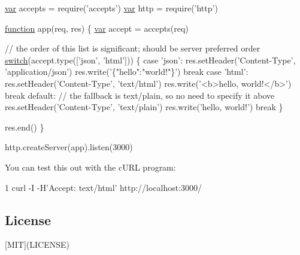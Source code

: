 \begin{DoxyCode}
\hyperlink{018__def_8c_a335628f2e9085305224b4f9cc6e95ed5}{var} accepts = require(\textcolor{stringliteral}{'accepts'})
\hyperlink{018__def_8c_a335628f2e9085305224b4f9cc6e95ed5}{var} http = require('http')

\hyperlink{class_test_a51a683fa4fcec142ab1574e00a7b6860}{function} app(req, res) \{
  \hyperlink{018__def_8c_a335628f2e9085305224b4f9cc6e95ed5}{var} accept = accepts(req)

  \textcolor{comment}{// the order of this list is significant; should be server preferred order}
  \hyperlink{ce__parse_8cpp_ada8aa24d50028bab4e2a4437e6eb7807}{switch}(accept.type(['json', 'html'])) \{
    \textcolor{keywordflow}{case} \textcolor{stringliteral}{'json'}:
      res.setHeader(\textcolor{stringliteral}{'Content-Type'}, \textcolor{stringliteral}{'application/json'})
      res.write(\textcolor{stringliteral}{'\{"hello":"world!"\}'})
      \textcolor{keywordflow}{break}
    \textcolor{keywordflow}{case} \textcolor{stringliteral}{'html'}:
      res.setHeader(\textcolor{stringliteral}{'Content-Type'}, \textcolor{stringliteral}{'text/html'})
      res.write(\textcolor{stringliteral}{'<b>hello, world!</b>'})
      \textcolor{keywordflow}{break}
    \textcolor{keywordflow}{default}:
      \textcolor{comment}{// the fallback is text/plain, so no need to specify it above}
      res.setHeader(\textcolor{stringliteral}{'Content-Type'}, \textcolor{stringliteral}{'text/plain'})
      res.write(\textcolor{stringliteral}{'hello, world!'})
      \textcolor{keywordflow}{break}
  \}

  res.end()
\}

http.createServer(app).listen(3000)
\end{DoxyCode}


You can test this out with the c\+U\+R\+L program\+: 
\begin{DoxyCode}
1 curl -I -H'Accept: text/html' http://localhost:3000/
\end{DoxyCode}


\subsection*{License}

\mbox{[}M\+I\+T\mbox{]}(L\+I\+C\+E\+N\+S\+E) 